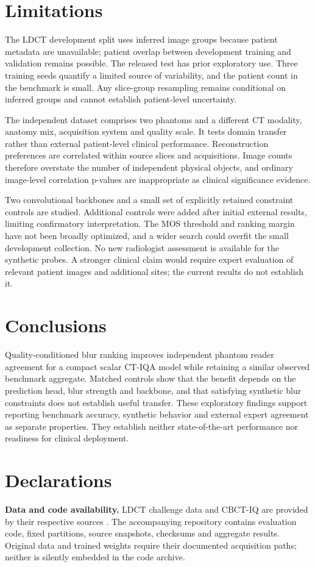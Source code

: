 \documentclass[11pt]{article}
\begin{document}
\section{Limitations}
The LDCT development split uses inferred image groups because patient metadata are unavailable; patient overlap between development training and validation remains possible. The released test has prior exploratory use. Three training seeds quantify a limited source of variability, and the patient count in the benchmark is small. Any slice-group resampling remains conditional on inferred groups and cannot establish patient-level uncertainty.

The independent dataset comprises two phantoms and a different CT modality, anatomy mix, acquisition system and quality scale. It tests domain transfer rather than external patient-level clinical performance. Reconstruction preferences are correlated within source slices and acquisitions. Image counts therefore overstate the number of independent physical objects, and ordinary image-level correlation p-values are inappropriate as clinical significance evidence.

Two convolutional backbones and a small set of explicitly retained constraint controls are studied. Additional controls were added after initial external results, limiting confirmatory interpretation. The MOS threshold and ranking margin have not been broadly optimized, and a wider search could overfit the small development collection. No new radiologist assessment is available for the synthetic probes. A stronger clinical claim would require expert evaluation of relevant patient images and additional sites; the current results do not establish it.
\section{Conclusions}
Quality-conditioned blur ranking improves independent phantom reader agreement for a compact scalar CT-IQA model while retaining a similar observed benchmark aggregate. Matched controls show that the benefit depends on the prediction head, blur strength and backbone, and that satisfying synthetic blur constraints does not establish useful transfer. These exploratory findings support reporting benchmark accuracy, synthetic behavior and external expert agreement as separate properties. They establish neither state-of-the-art performance nor readiness for clinical deployment.
\section*{Declarations}
\textbf{Data and code availability.} LDCT challenge data and CBCT-IQ are provided by their respective sources \cite{challenge,cbctdata}. The accompanying repository contains evaluation code, fixed partitions, source snapshots, checksums and aggregate results. Original data and trained weights require their documented acquisition paths; neither is silently embedded in the code archive.
\end{document}
